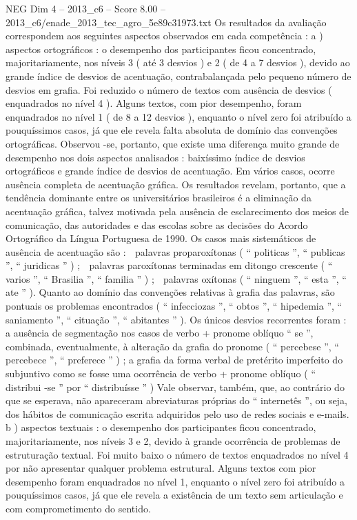 \begin{textsample}{NEG Dim 4 – 2013\_c6 – Score 8.00 – 2013\_c6/enade\_2013\_tec\_agro\_5e89c31973.txt}
Os resultados da avaliação correspondem aos seguintes aspectos observados em cada competência : a ) aspectos ortográficos : o desempenho dos participantes ficou concentrado, majoritariamente, nos níveis 3 ( até 3 desvios ) e 2 ( de 4 a 7 desvios ), devido ao grande índice de desvios de acentuação, contrabalançada pelo pequeno número de desvios em grafia.
Foi reduzido o número de textos com ausência de desvios ( enquadrados no nível 4 ).
Alguns textos, com pior desempenho, foram enquadrados no nível 1 ( de 8 a 12 desvios ), enquanto o nível zero foi atribuído a pouquíssimos casos, já que ele revela falta absoluta de domínio das convenções ortográficas.
Observou -se, portanto, que existe uma diferença muito grande de desempenho nos dois aspectos analisados : baixíssimo índice de desvios ortográficos e grande índice de desvios de acentuação.
Em vários casos, ocorre ausência completa de acentuação gráfica.
Os resultados revelam, portanto, que a tendência dominante entre os universitários brasileiros é a eliminação da acentuação gráfica, talvez motivada pela ausência de esclarecimento dos meios de comunicação, das autoridades e das escolas sobre as decisões do Acordo Ortográfico da Língua Portuguesa de 1990.
Os casos mais sistemáticos de ausência de acentuação são :  palavras proparoxítonas ( “ politicas ”, “ publicas ”, “ juridicas ” ) ;  palavras paroxítonas terminadas em ditongo crescente ( “ varios ”, “ Brasilia ”, “ familia ” ) ;  palavras oxítonas ( “ ninguem ”, “ esta ”, “ ate ” ).
Quanto ao domínio das convenções relativas à grafia das palavras, são pontuais os problemas encontrados ( “ infecciozas ”, “ obtos ”, “ hipedemia ”, “ saniamento ”, “ cituação ”, “ abitantes ” ).
Os únicos desvios recorrentes foram : a ausência de segmentação nos casos de verbo + pronome oblíquo “ se ”, combinada, eventualmente, à alteração da grafia do pronome ( “ percebese ”, “ percebece ”, “ preferece ” ) ; a grafia da forma verbal de pretérito imperfeito do subjuntivo como se fosse uma ocorrência de verbo + pronome oblíquo ( “ distribui -se ” por “ distribuísse ” ) Vale observar, também, que, ao contrário do que se esperava, não apareceram abreviaturas próprias do “ internetês ”, ou seja, dos hábitos de comunicação escrita adquiridos pelo uso de redes sociais e e-mails. b ) aspectos textuais : o desempenho dos participantes ficou concentrado, majoritariamente, nos níveis 3 e 2, devido à grande ocorrência de problemas de estruturação textual.
Foi muito baixo o número de textos enquadrados no nível 4 por não apresentar qualquer problema estrutural.
Alguns textos com pior desempenho foram enquadrados no nível 1, enquanto o nível zero foi atribuído a pouquíssimos casos, já que ele revela a existência de um texto sem articulação e com comprometimento do sentido.

\end{textsample}
